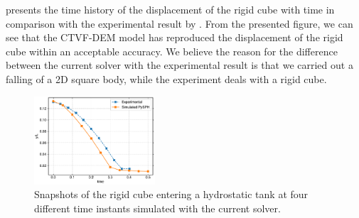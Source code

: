  presents the time history of the
displacement of the rigid cube with time in comparison with the experimental
result by \cite{wu_two-way_2014}. From the presented figure, we can see that the
CTVF-DEM model has reproduced the displacement of the rigid cube within an
acceptable accuracy. We believe the reason for the difference between the
current solver with the experimental result is that we carried out a falling of
a 2D square body, while the experiment deals with a rigid cube.
\begin{figure}[!htpb]
  \centering
  \includegraphics[width=0.4\textwidth]{figures/rfc/figures/qiu_2017_falling_solid_in_water_2d/y_cm_vs_time}
  \caption{Snapshots of the rigid cube entering a hydrostatic tank at four
    different time instants simulated with the current solver.}
\label{fig:disp-falling-solid-in-water}
\end{figure}






